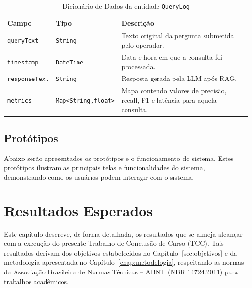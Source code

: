 \begin{description}
\begin{table}[H]
  \centering
  \caption{Dicionário de Dados da entidade \texttt{QueryLog}}
  \label{tab:dd_querylog}
  \begin{tabular}{|p{3cm}|p{4cm}|p{8cm}|}
    \hline
    \textbf{Campo}       & \textbf{Tipo}         & \textbf{Descrição} \\ \hline
    \texttt{queryText}    & \texttt{String}       & Texto original da pergunta submetida pelo operador. \\ \hline
    \texttt{timestamp}    & \texttt{DateTime}     & Data e hora em que a consulta foi processada. \\ \hline
    \texttt{responseText} & \texttt{String}       & Resposta gerada pela LLM após RAG. \\ \hline
    \texttt{metrics}      & \texttt{Map<String,float>} & Mapa contendo valores de precisão, recall, F1 e latência para aquela consulta. \\ \hline
  \end{tabular}
\end{table}

\section{Protótipos}
\label{sec:prototipos}
\noindent Abaixo serão apresentados os protótipos e o funcionamento do sistema. Estes protótipos ilustram as principais telas e funcionalidades do sistema, demonstrando como os usuários podem interagir com o sistema.



\chapter{Resultados Esperados}
\label{chap:resultados}

Este capítulo descreve, de forma detalhada, os resultados que se almeja alcançar com a execução do presente Trabalho de Conclusão de Curso (TCC). Tais resultados derivam dos objetivos estabelecidos no Capítulo~\ref{sec:objetivos} e da metodologia apresentada no Capítulo~\ref{chap:metodologia}, respeitando as normas da Associação Brasileira de Normas Técnicas -- ABNT (NBR 14724:2011) para trabalhos acadêmicos.


\end{description}
